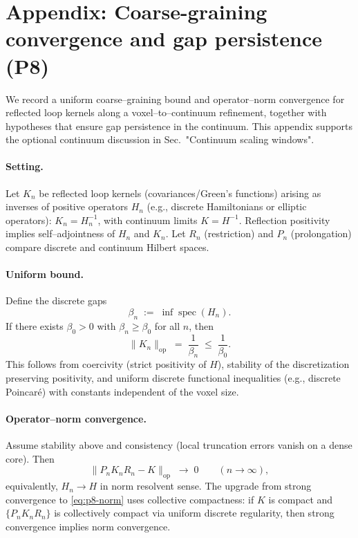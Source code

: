 \documentclass[11pt]{amsart}
\begin{document}
\section{Appendix: Coarse-graining convergence and gap persistence (P8)}

We record a uniform coarse--graining bound and operator--norm convergence for reflected loop kernels along a voxel--to--continuum refinement, together with hypotheses that ensure gap persistence in the continuum. This appendix supports the optional continuum discussion in Sec.~"Continuum scaling windows".

\paragraph{Setting.}
Let $K_n$ be reflected loop kernels (covariances/Green's functions) arising as inverses of positive operators $H_n$ (e.g., discrete Hamiltonians or elliptic operators): $K_n=H_n^{-1}$, with continuum limits $K=H^{-1}$. Reflection positivity implies self--adjointness of $H_n$ and $K_n$. Let $R_n$ (restriction) and $P_n$ (prolongation) compare discrete and continuum Hilbert spaces.

\paragraph{Uniform bound.}
Define the discrete gaps
\[
  \beta_n\;:=\;\inf \operatorname{spec}(H_n).
\]
If there exists $\beta_0>0$ with $\beta_n\ge \beta_0$ for all $n$, then
\[
  \lVert K_n\rVert_{\mathrm{op}}\;=\;\frac{1}{\beta_n}\;\le\;\frac{1}{\beta_0}.
\]
This follows from coercivity (strict positivity of $H$), stability of the discretization preserving positivity, and uniform discrete functional inequalities (e.g., discrete Poincar\'e) with constants independent of the voxel size.

\paragraph{Operator--norm convergence.}
Assume stability above and consistency (local truncation errors vanish on a dense core). Then
\begin{equation}
\label{eq:p8-norm}
  \big\lVert P_n K_n R_n - K\big\rVert_{\mathrm{op}}\;\longrightarrow\;0\qquad (n\to\infty),
\end{equation}
equivalently, $H_n\to H$ in norm resolvent sense. The upgrade from strong convergence to \eqref{eq:p8-norm} uses collective compactness: if $K$ is compact and $\{P_n K_n R_n\}$ is collectively compact via uniform discrete regularity, then strong convergence implies norm convergence.
\end{document}
